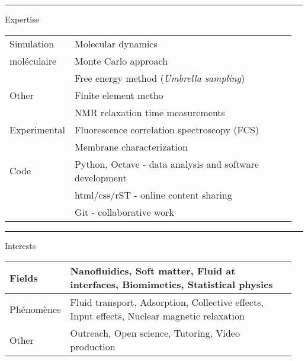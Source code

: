 \documentclass[a4paper,11pt]{concours}
\begin{document}
\vspace{0.5cm}

\noindent\begin{minipage}{0.135\linewidth}
{\color{gray120}\rule{\textwidth}{0.22cm}\relax}
\end{minipage}
\begin{minipage}{0.82\linewidth}
{\textcolor{gray120}{\huge Expertise}}
\end{minipage}

\begin{table}[htbp]
\begin{tabular}{@{} p{0.12\linewidth} p{0.84\linewidth} @{}}
Simulation & Molecular dynamics \\
moléculaire      & Monte Carlo approach \\ 
      & Free energy method (\textit{Umbrella sampling}) \\
\hline \hline
Other     & Finite element metho \\
      & NMR relaxation time measurements \\
\hline \hline
Experimental & Fluorescence correlation spectroscopy (FCS) \\
     & Membrane characterization \\
\hline \hline
Code &  Python, Octave - data analysis and software development \\
   & html/css/rST - online content sharing \\
   & Git - collaborative work \\
\end{tabular}
\end{table}

\vspace{0.5cm}

\noindent\begin{minipage}{0.135\linewidth}
{\color{gray120}\rule{\textwidth}{0.22cm}\relax}
\end{minipage}
\begin{minipage}{0.82\linewidth}
{\textcolor{gray120}{\huge Interests}}
\end{minipage}

\begin{table}[htbp]
\begin{tabular}{@{} p{0.12\linewidth} p{0.84\linewidth} @{}}
      Fields & Nanofluidics, Soft matter, Fluid at interfaces, Biomimetics, Statistical physics \\
\hline \hline
Phénomènes & Fluid transport, Adsorption, Collective effects, Input effects, Nuclear magnetic relaxation \\ 
\hline \hline
Other & Outreach, Open science, Tutoring, Video production \\
\end{tabular}
\end{table}
\end{document}
